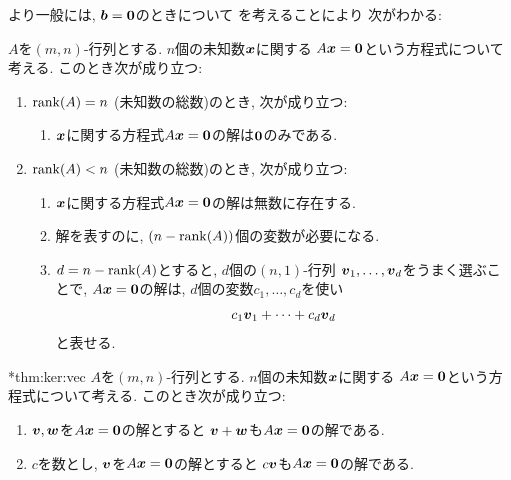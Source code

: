 より一般には,
$\boldsymbol{b}=\boldsymbol{0}$のときについて
を考えることにより
次がわかる:
\begin{theorem}
  \label{thm:solution:homoge}
  
$A$を$(m,n)$-行列とする.
$n$個の未知数$\boldsymbol{x}$に関する
$A\boldsymbol{x}=\boldsymbol{0}$という方程式について考える.
  このとき次が成り立つ:
  \begin{enumerate}
  \item $\operatorname{rank}(A)=n$ (未知数の総数)のとき, 次が成り立つ:
    \begin{enumerate}
    \item $\boldsymbol{x}$に関する方程式$A\boldsymbol{x}=\boldsymbol{0}$の解は$\boldsymbol{0}$のみである.
    \end{enumerate}
  \item $\operatorname{rank}(A)<n$ (未知数の総数)のとき, 次が成り立つ:
    \begin{enumerate}
    \item $\boldsymbol{x}$に関する方程式$A\boldsymbol{x}=\boldsymbol{0}$の解は無数に存在する.
    \item 解を表すのに, $(n-\operatorname{rank}(A))$個の変数が必要になる.
    \item $d=n-\operatorname{rank}(A)$とすると,
      $d$個の$(n,1)$-行列
      $\boldsymbol{v}_1,\ldots,\boldsymbol{v}_d$をうまく選ぶことで,
      $A\boldsymbol{x}=\boldsymbol{0}$の解は, $d$個の変数$c_1,\ldots,c_d$を使い
      \begin{align*}
        c_1\boldsymbol{v}_1+\cdots+c_d\boldsymbol{v}_d
      \end{align*}
      と表せる.
    \end{enumerate}
  \end{enumerate}
\end{theorem}

\begin{prop}
  \provelater**{thm:ker:vec}
  \label{thm:ker:vec}
  $A$を$(m,n)$-行列とする.
  $n$個の未知数$\boldsymbol{x}$に関する
  $A\boldsymbol{x}=\boldsymbol{0}$という方程式について考える.
  このとき次が成り立つ:
  \begin{enumerate}
  \item{}
    $\boldsymbol{v},\boldsymbol{w}$を$A\boldsymbol{x}=\boldsymbol{0}$の解とすると $\boldsymbol{v}+\boldsymbol{w}$も$A\boldsymbol{x}=\boldsymbol{0}$の解である.
  \item{}
    $c$を数とし, $\boldsymbol{v}$を$A\boldsymbol{x}=\boldsymbol{0}$の解とすると $c\boldsymbol{v}$も$A\boldsymbol{x}=\boldsymbol{0}$の解である.
  \end{enumerate}
\end{prop}




